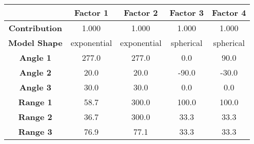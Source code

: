 \begin{tabular}{ccccc}
\toprule
{} &     Factor 1 &     Factor 2 &   Factor 3 &   Factor 4 \\
\midrule
\textbf{Contribution} &        1.000 &        1.000 &      1.000 &      1.000 \\
\textbf{Model Shape } &  exponential &  exponential &  spherical &  spherical \\
\textbf{Angle 1     } &        277.0 &        277.0 &        0.0 &       90.0 \\
\textbf{Angle 2     } &         20.0 &         20.0 &      -90.0 &      -30.0 \\
\textbf{Angle 3     } &         30.0 &         30.0 &        0.0 &        0.0 \\
\textbf{Range 1     } &         58.7 &        300.0 &      100.0 &      100.0 \\
\textbf{Range 2     } &         36.7 &        300.0 &       33.3 &       33.3 \\
\textbf{Range 3     } &         76.9 &         77.1 &       33.3 &       33.3 \\
\bottomrule
\end{tabular}
